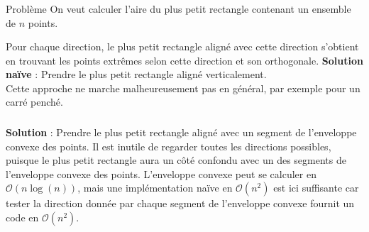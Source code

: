 \begin{frame}
    \frametitle{\problemtitle}
    \begin{block}{Problème}
        On veut calculer l'aire du plus petit rectangle contenant un ensemble de $n$ points.
    \end{block}
    \pause
    Pour chaque direction, le plus petit rectangle aligné avec cette direction s'obtient en trouvant les points extrêmes selon cette direction et son orthogonale. \newline \newline
    \textbf{Solution naïve} : Prendre le plus petit rectangle aligné verticalement. \\
    \pause
    Cette approche ne marche malheureusement pas en général, par exemple pour un carré penché.
\end{frame}

\begin{frame}
    \frametitle{\problemtitle}
    \textbf{Solution} : Prendre le plus petit rectangle aligné avec un segment de l'enveloppe convexe des points. \newline \newline
    \pause
    Il est inutile de regarder toutes les directions possibles, puisque le plus petit rectangle aura un côté confondu avec un des segments de l'enveloppe convexe des points. \newline \newline
    \pause
    L'enveloppe convexe peut se calculer en $\mathcal{O}(n \log(n))$, mais une implémentation naïve en $\mathcal{O}(n^2)$ est ici suffisante car tester la direction donnée par chaque segment de l'enveloppe convexe fournit un code en $\mathcal{O}(n^2)$.
\end{frame}